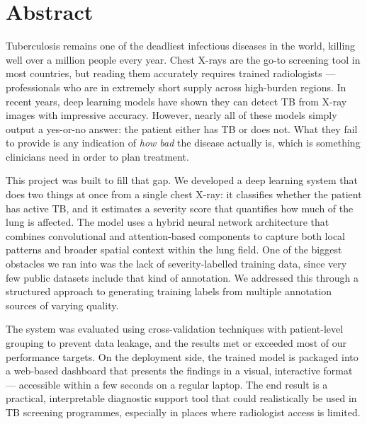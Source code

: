 \documentclass[12pt]{report}
\begin{document}
\begin{titlepage}
\begin{center}
{    
    
    
    \textbf{\fontsize{16}{18}\selectfont GURU NANAK DEV ENGINEERING COLLEGE,}\\
    \textbf{\fontsize{16}{18}\selectfont LUDHIANA, 141006}\\
    {\fontsize{12}{14}\selectfont March 2026}\\
\end{center}
\end{titlepage}


\setcounter{page}{1} 

\chapter*{Abstract}
\doublespacing

Tuberculosis remains one of the deadliest infectious diseases in the world, killing well over a million people every year. Chest X-rays are the go-to screening tool in most countries, but reading them accurately requires trained radiologists --- professionals who are in extremely short supply across high-burden regions. In recent years, deep learning models have shown they can detect TB from X-ray images with impressive accuracy. However, nearly all of these models simply output a yes-or-no answer: the patient either has TB or does not. What they fail to provide is any indication of \textit{how bad} the disease actually is, which is something clinicians need in order to plan treatment.

This project was built to fill that gap. We developed a deep learning system that does two things at once from a single chest X-ray: it classifies whether the patient has active TB, and it estimates a severity score that quantifies how much of the lung is affected. The model uses a hybrid neural network architecture that combines convolutional and attention-based components to capture both local patterns and broader spatial context within the lung field. One of the biggest obstacles we ran into was the lack of severity-labelled training data, since very few public datasets include that kind of annotation. We addressed this through a structured approach to generating training labels from multiple annotation sources of varying quality.

The system was evaluated using cross-validation techniques with patient-level grouping to prevent data leakage, and the results met or exceeded most of our performance targets. On the deployment side, the trained model is packaged into a web-based dashboard that presents the findings in a visual, interactive format --- accessible within a few seconds on a regular laptop. The end result is a practical, interpretable diagnostic support tool that could realistically be used in TB screening programmes, especially in places where radiologist access is limited.
\end{document}
